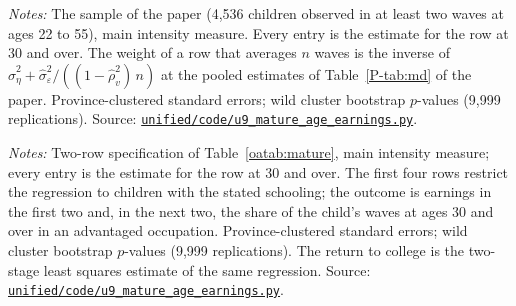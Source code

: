 \documentclass[11pt]{article}
\numberwithin{equation}{section}
\newcommand{\repourl}{https://github.com/JiachenJin1001/before-the-labor-market-or-inside-it}
\newcommand{\code}[1]{\href{\repourl/blob/main/#1}{\nolinkurl{#1}}}
\begin{document}
\begin{table}[H]
\centering
\small
\caption{The instrumented return to college at ages 30 and over: the
main specification and its variants.}
\label{oatab:variants}
\setlength{\tabcolsep}{4pt}
\resizebox{\ifdim\width>\textwidth\textwidth\else\width\fi}{!}{}
\par\smallskip
\begin{minipage}{0.94\textwidth}
\footnotesize\emph{Notes:} The sample of the paper (4,536 children
observed in at least two waves at ages 22 to 55), main intensity
measure. Every entry is the estimate for the row at 30 and over. The
weight of a row that averages $n$ waves is the inverse of
$\hat\sigma^2_\eta + \hat\sigma^2_\varepsilon / ((1 - \hat\rho_v^2)\, n)$
at the pooled estimates of Table~\ref{P-tab:md} of the paper.
Province-clustered standard errors; wild cluster bootstrap $p$-values
(9,999 replications). Source: \code{unified/code/u9_mature_age_earnings.py}.
\end{minipage}
\end{table}

\begin{table}[tbp]
\centering
\small
\caption{Checks of the earnings result at ages 30 and over.}
\label{oatab:maturechecks}
\setlength{\tabcolsep}{3.5pt}
\resizebox{\ifdim\width>\textwidth\textwidth\else\width\fi}{!}{}
\par\smallskip
\begin{minipage}{0.96\textwidth}
\footnotesize\emph{Notes:} Two-row specification of
Table~\ref{oatab:mature}, main intensity measure; every
entry is the estimate for the row at 30 and over. The first four rows
restrict the regression to children with the stated schooling; the outcome is earnings in the first two and, in the next two, the share of the child's waves at ages 30 and over in an advantaged occupation.
Province-clustered standard errors; wild cluster bootstrap $p$-values
(9,999 replications). The return to college is the two-stage least
squares estimate of the same regression. Source:
\code{unified/code/u9_mature_age_earnings.py}.
\end{minipage}
\end{table}
\end{document}
